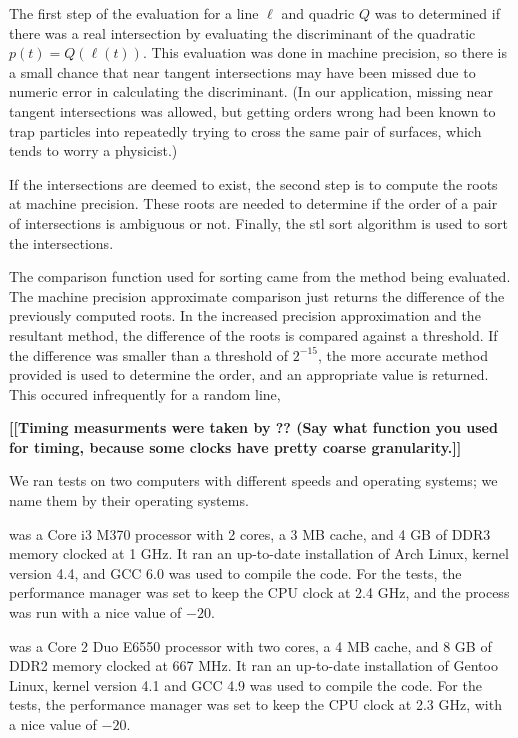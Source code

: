 \documentclass{cccg16}
\def\Jack#1{{\bf [[#1]]}\ignorespaces}
\begin{document}
The first step of the evaluation for a line $\ell$ and quadric $Q$ was
to determined if there was a real intersection by evaluating the
discriminant of the quadratic~$p(t)=Q(\ell(t))$.  This evaluation was
done in machine precision, so there is a small chance that near
tangent intersections may have been missed due to numeric error in
calculating the discriminant. (In our application, missing near
tangent intersections was allowed, but getting orders wrong had been
known to trap particles into repeatedly trying to cross the same pair
of surfaces, which tends to worry a physicist.)

If the intersections are deemed to exist, the second step is to
compute the roots at machine precision.  These roots are needed to
determine if the order of a pair of intersections is ambiguous or not.
Finally, the stl sort algorithm is used to sort the intersections.

The comparison function used for sorting came from the method being
evaluated.  The machine precision approximate comparison just returns
the difference of the previously computed roots.  In the increased
precision approximation and the resultant method, the difference of
the roots is compared against a threshold.  If the difference was
smaller than a threshold of $2^{-15}$, the more accurate method
provided is used to determine the order, and an appropriate value is
returned.  This occured infrequently for a random line,

\Jack{Timing measurments were taken by  ?? (Say what function you used for timing, because some clocks have pretty coarse granularity.}

We ran tests on two computers with different speeds and operating
systems; we name them by their operating systems.

 was a Core i3 M370 processor with 2 cores, a 3 MB
cache, and 4 GB of DDR3 memory clocked at 1 GHz.  It ran an up-to-date
installation of Arch Linux, kernel version 4.4, and GCC 6.0 was used
to compile the code.  For the tests, the performance manager was set
to keep the CPU clock at 2.4 GHz, and the process was run with a nice
value of $-20$.

 was a Core 2 Duo E6550 processor with two cores,
a 4 MB cache, and 8 GB of DDR2 memory clocked at 667 MHz.  It ran an
up-to-date installation of Gentoo Linux, kernel version 4.1 and GCC
4.9 was used to compile the code.  For the tests, the performance
manager was set to keep the CPU clock at 2.3 GHz, with a nice value of
$-20$.
\end{document}
